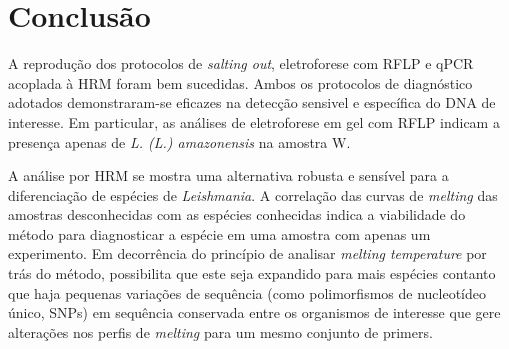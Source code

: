 \section{Conclusão}

A reprodução dos protocolos de \textit{salting out}, eletroforese com RFLP e
qPCR acoplada à HRM foram bem sucedidas. Ambos os protocolos de diagnóstico
adotados demonstraram-se eficazes na detecção sensivel e específica do DNA de
interesse. Em particular, as análises de eletroforese em gel com RFLP indicam a
presença apenas de \textit{L. (L.) amazonensis} na amostra W. 

A análise por HRM se mostra uma alternativa robusta e sensível para a
diferenciação de espécies de \textit{Leishmania}. A correlação das curvas de
\textit{melting} das amostras desconhecidas com as espécies conhecidas indica a
viabilidade do método para diagnosticar a espécie em uma amostra com apenas um
experimento. Em decorrência do princípio de analisar \textit{melting
temperature} por trás do método, possibilita que este seja expandido para mais
espécies contanto que haja pequenas variações de sequência (como polimorfismos
de nucleotídeo único, SNPs) em sequência conservada entre os organismos de
interesse que gere alterações nos perfis de \textit{melting} para um mesmo
conjunto de primers. 

